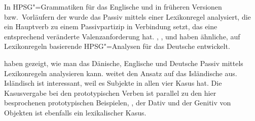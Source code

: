 {{In HPSG"=Grammatiken für das Englische \citep[--218]{ps}
und in früheren Versionen bzw.\ Vorläufern der \lfg \citep{Bresnan78a,Bresnan82a} wurde das Passiv mittels einer Lexikonregel
analysiert, die ein Hauptverb zu einem Passivpartizip in Verbindung setzt, das eine entsprechend
veränderte Valenzanforderung hat.
\citet[]{Kiss92}, 
\citet{HN98a},
\citet[]{Kathol98b} und
\citet{Mueller2000h}
haben ähnliche, auf Lexikonregeln basierende HPSG"=Analysen für das Deutsche entwickelt.

\citet{MOe2013a} haben gezeigt, wie man das Dänische, Englische und Deutsche Passiv mittels
Lexikonregeln analysieren kann. \citet{MuellerGermanic} weitet den Ansatz auf das Isländische
aus. Isländisch ist interessant, weil es Subjekte in allen vier Kasus hat. Die Kasusvergabe bei den
prototypischen Verben ist parallel zu den hier besprochenen prototypischen Beispielen, \dash, der
Dativ und der Genitiv von Objekten ist ebenfalls ein lexikalischer Kasus.
}




}
